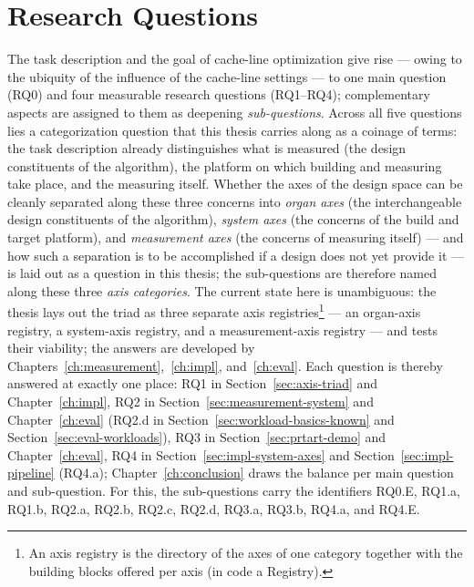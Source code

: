 \section{Research Questions}\label{sec:rqs}
The task description and the goal of cache-line optimization give rise --- owing to the
ubiquity of the influence of the cache-line settings --- to one main question (RQ0) and four
measurable research questions (RQ1--RQ4); complementary aspects are assigned to them as deepening \emph{sub-questions}.
Across all five questions lies a categorization question that this thesis carries along as a coinage
of terms: the task description already distinguishes what is measured (the design constituents of the
algorithm), the platform on which building and measuring take place, and the measuring itself. Whether the
axes of the design space can be cleanly separated along these three concerns into \emph{organ axes} (the
interchangeable design constituents of the algorithm), \emph{system axes} (the concerns of the build
and target platform), and \emph{measurement axes} (the concerns of measuring itself) --- and
how such a separation is to be accomplished if a design does not yet provide
it --- is laid out as a question in this thesis; the sub-questions are therefore named along these three
\emph{axis categories}. The current state here is unambiguous: the thesis lays out the triad as
three separate axis registries\footnote{An axis registry is the directory of the axes of one
  category together with the building blocks offered per axis (in code a Registry).} --- an
organ-axis registry, a system-axis registry, and a
measurement-axis registry --- and tests their viability; the answers are developed by
Chapters~\ref{ch:measurement},~\ref{ch:impl}, and~\ref{ch:eval}.
Each question is thereby answered at exactly one place: RQ1 in Section~\ref{sec:axis-triad} and
Chapter~\ref{ch:impl}, RQ2 in Section~\ref{sec:measurement-system} and Chapter~\ref{ch:eval}
(RQ2.d in Section~\ref{sec:workload-basics-known} and Section~\ref{sec:eval-workloads}), RQ3 in
Section~\ref{sec:prtart-demo} and Chapter~\ref{ch:eval}, RQ4 in
Section~\ref{sec:impl-system-axes} and Section~\ref{sec:impl-pipeline} (RQ4.a);
Chapter~\ref{ch:conclusion} draws the balance per main question and
sub-question. For this, the sub-questions carry the identifiers RQ0.E, RQ1.a, RQ1.b, RQ2.a, RQ2.b, RQ2.c, RQ2.d,
RQ3.a, RQ3.b, RQ4.a, and RQ4.E.
